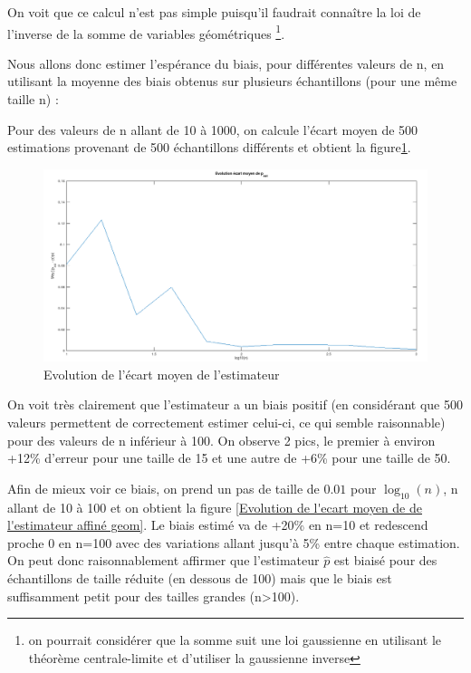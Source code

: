 \documentclass[12pt,a4paper,titlepage]{article}
\numberwithin{equation}{section}
\begin{document}
On voit que ce calcul n'est pas simple puisqu'il
faudrait connaître la loi de l'inverse de la somme de variables géométriques \footnote{on pourrait considérer que la somme suit une loi gaussienne en utilisant le théorème centrale-limite et d'utiliser la gaussienne inverse}. 

Nous allons donc estimer l'espérance du biais, pour différentes valeurs de n, en utilisant la moyenne des biais obtenus sur plusieurs échantillons (pour une même taille n) :



Pour des valeurs de n allant de 10 à 1000, on calcule l'écart moyen de 500 estimations provenant de 500 échantillons différents et obtient la figure\ref{Evolution de l'écart moyen de de l'estimateur geom}.

\begin{figure}[!h]
\begin{center}
 \includegraphics[scale=0.3]{images/biaisMoyGeom.png} 
\end{center}
 \caption{Evolution de l'écart moyen de l'estimateur}
 \label{Evolution de l'écart moyen de de l'estimateur geom}
\end{figure}

On voit très clairement que l'estimateur a un biais positif (en considérant que 500 valeurs permettent de correctement estimer celui-ci, ce qui semble raisonnable) pour des valeurs de n inférieur à 100. On observe 2 pics, le premier à environ +12\% d'erreur pour une taille de 15 et une autre de +6\% pour une taille de 50.

Afin de mieux voir ce biais, on prend un pas de taille de $0.01$ pour $\log_{10}(n)$, n allant de 10 à 100 et on obtient la figure \ref{Evolution de l'ecart moyen de de l'estimateur affiné geom}. Le biais estimé va de +20\% en n=10 et redescend proche 0 en n=100 avec des variations allant jusqu'à 5\% entre chaque estimation. On peut donc raisonnablement affirmer que l'estimateur $\hat{p}$ est biaisé pour des échantillons de taille réduite (en dessous de 100) mais que le biais est suffisamment petit pour des tailles grandes (n>100).
\end{document}
